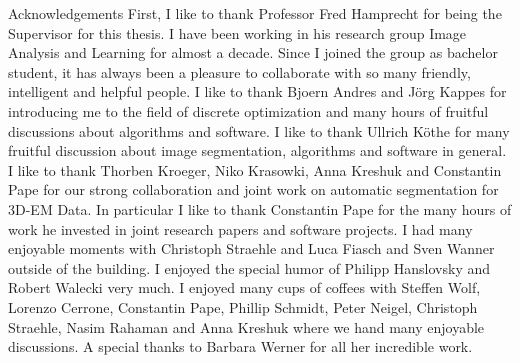 \begin{coverpage}{Acknowledgements}
First, I like to thank Professor Fred Hamprecht for being the Supervisor for this thesis. I have been working in his research group Image Analysis and Learning for almost a decade. Since I joined the group as bachelor student, it has always been a pleasure to collaborate with so many friendly, intelligent and helpful people. I like to thank Bjoern Andres and Jörg Kappes for introducing me to the field of discrete optimization and many hours of fruitful discussions about algorithms and software. I like to thank Ullrich Köthe for many fruitful discussion about image segmentation, algorithms and software in general. I like to thank Thorben Kroeger, Niko Krasowki, Anna Kreshuk and Constantin Pape for our strong collaboration and joint work on automatic segmentation for 3D-EM Data. In particular I like to thank Constantin Pape for the many hours of work he invested in joint research papers and software projects. I had many enjoyable moments with Christoph Straehle and Luca Fiasch and Sven Wanner outside of the building. I enjoyed the special humor of Philipp Hanslovsky and Robert Walecki very much. I enjoyed many cups of coffees with Steffen Wolf, Lorenzo Cerrone, Constantin Pape, Phillip Schmidt, Peter Neigel, Christoph Straehle, Nasim Rahaman and Anna Kreshuk where we hand many enjoyable discussions. A special thanks to Barbara Werner for all her incredible work.

\end{coverpage}
